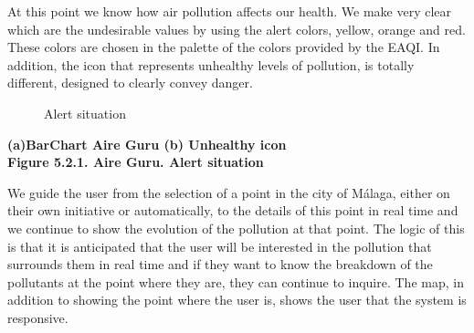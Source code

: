 At this point we know how air pollution affects our health.
We make very clear which are the undesirable values by using the alert colors, yellow, orange and red.
These colors are chosen in the palette of the colors provided by the EAQI.
In addition, the icon that represents unhealthy levels of pollution, is totally different, designed to clearly convey danger. \\

\begin{figure}[ht]
    \centering
    \hfill
    \caption{Alert situation}
\end{figure}

\begin{center}
    \bf{ (a)BarChart Aire Guru (b) Unhealthy icon\\
    
    Figure 5.2.1. Aire Guru. Alert situation}
\end{center} 

We guide the user from the selection of a point in the city of Málaga, either on their own initiative
or automatically, to the details of this point in real time and we continue to show the evolution of the pollution at that point.
The logic of this is that it is anticipated that the user will be interested in the pollution that surrounds them in real time and if
they want to know the breakdown of the pollutants at the point where they are, they can continue to inquire.
The map, in addition to showing the point where the user is, shows the user that the system is responsive.